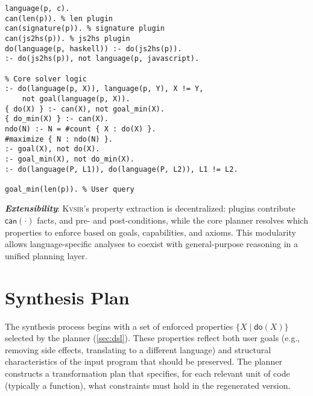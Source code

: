 \documentclass[sigplan]{acmart}
\def\eg{{\em e.g.}, }
\newcommand{\sys}{{\scshape Kv{\textalpha}sir}\xspace}
\newcommand{\heading}[1]{\vspace{2pt}\noindent\textbf{\emph{#1}}:\enspace}
\newcommand{\ttt}[1]{\texttt{#1}}
\begin{document}
\begin{listing}
  \begin{verbatim}
language(p, c).
can(len(p)). % len plugin
can(signature(p)). % signature plugin
can(js2hs(p)). % js2hs plugin
do(language(p, haskell)) :- do(js2hs(p)).
:- do(js2hs(p)), not language(p, javascript).

% Core solver logic
:- do(language(p, X)), language(p, Y), X != Y,
    not goal(language(p, X)).
{ do(X) } :- can(X), not goal_min(X).
{ do_min(X) } :- can(X).
ndo(N) :- N = #count { X : do(X) }.
#maximize { N : ndo(N) }.
:- goal(X), not do(X).
:- goal_min(X), not do_min(X).
:- do(language(P, L1)), do(language(P, L2)), L1 != L2.

goal_min(len(p)). % User query
\end{verbatim}
  \caption{\textbf{Example \sys logic program.}
  This is a lightly simplified version of the logic program that produces the plan for the idiomatization task~(\cref{sec:example}). 
  The program contains facts coming from (1) the input program (it is written in C),
  (2) three plugins (\ttt{len}, \ttt{signature}, and \ttt{js2hs}),
  (3) axioms from the logic engine (\eg a program can have one language, an analysis will be applied only if possible, all goals must be satisfied), and
  (4) the user query (the user wants to minimize the length of the program).
  }
  \label{lst:logic-example}
\end{listing}

\heading{Extensibility}
\sys's property extraction is decentralized: plugins contribute $\mathsf{can}(\cdot)$ facts, and pre- and post-conditions, while the core planner resolves which properties to enforce based on goals, capabilities, and axioms.
This modularity allows language-specific analyses to coexist with general-purpose reasoning in a unified planning layer.

\section{Synthesis Plan}

The synthesis process begins with a set of enforced properties $\{ X \mid \mathsf{do}(X) \}$ selected by the planner (\cref{sec:dsl}). These properties reflect both user goals (e.g., removing side effects, translating to a different language) and structural characteristics of the input program that should be preserved. The planner constructs a transformation plan that specifies, for each relevant unit of code (typically a function), what constraints must hold in the regenerated version.
\end{document}
